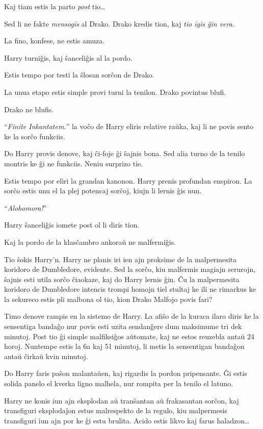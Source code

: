 Kaj tiam estis la parto \emph{post} tio\ldots{}

Sed li ne fakte \emph{mensogis} al Drako. Drako kredis tion, kaj
\emph{tio igis ĝin vera.}

La fino, konfese, ne estis amuza.

Harry turniĝis, kaj ŝanceliĝis al la pordo.

Estis tempo por testi la ŝlosan sorĉon de Drako.

La unua etapo estis simple provi turni la tenilon. Drako povintus blufi.

Drako ne blufis.

``\emph{Finite Inkantatem.}'' la voĉo de Harry eliris relative raŭka, kaj li ne povis sento ke la sorĉo funkciis.

Do Harry provis denove, kaj ĉi-foje ĝi ŝajnis bona. Sed alia turno de la tenilo montris ke ĝi ne funkciis. Neniu surprizo tie. 

Estis tempo por eliri la grandan kanonon. Harry prenis profundan enspiron. La sorĉo estis unu el la plej potencaj sorĉoj, kiujn li lernis ĝis nun.

“\emph{Alohomora!}”

Harry ŝanceliĝis iomete post ol li diris tion.

Kaj la pordo de la klasĉambro ankoraŭ ne malfermiĝis.

Tio ŝokis Harry'n. Harry ne planis iri ien ajn proksime de la
malpermesita koridoro de Dumbledore, evidente. Sed la sorĉo, kiu
malfermis magiajn serurojn, ŝajnis esti utila sorĉo ĉiaokaze, kaj do
Harry lernis ĝin. Ĉu la malpermesita koridoro de Dumbledore intencis
trompi homojn tiel stultaj ke ili ne rimarkus ke la sekureco estis pli
malbona ol tio, kion Drako Malfojo povis fari?

Timo denove rampis en la sistemo de Harry. La afiŝo de la kuraca ilaro
diris ke la sensentiga bandaĝo nur povis esti uzita sendanĝere dum
maksimume tri dek minutoj. Post tio ĝi simple malfiksiĝos aŭtomate,
kaj ne estos reuzebla antaŭ 24 horoj. Nuntempe estis la 6a kaj 51
minutoj, li metis la sensentigan bandaĝon antaŭ ĉirkaŭ kvin minutoj.

Do Harry faris paŝon malantaŭen, kaj rigardis la pordon
pripensante. Ĝi estis solida panelo el kverka ligno malhela, nur
rompita per la tenilo el latuno.

Harry ne konis iun ajn eksplodan aŭ tranŝantan aŭ frakasantan sorĉon,
kaj transfiguri eksplodaĵon estus malrespekto de la regulo, kiu
malpermesis transfiguri iun ajn por ke ĝi estu brulita. Acido estis
likvo kaj farus haladzon\ldots{}

